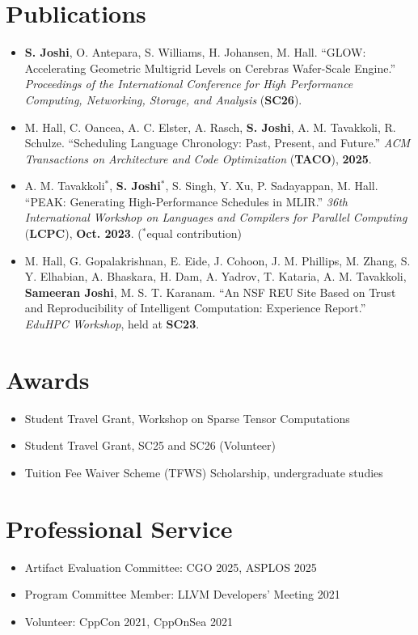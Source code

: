 \documentclass[10pt]{article}
\newcommand{\me}[1]{\textbf{#1}}
\begin{document}
\section*{Publications}

\begin{itemize}
  \item \me{S. Joshi}, O. Antepara, S. Williams, H. Johansen, M. Hall. ``GLOW: Accelerating Geometric Multigrid Levels on Cerebras Wafer-Scale Engine.'' \textit{Proceedings of the International Conference for High Performance Computing, Networking, Storage, and Analysis} (\textbf{SC26}).
  \item M. Hall, C. Oancea, A. C. Elster, A. Rasch, \me{S. Joshi}, A. M. Tavakkoli, R. Schulze. ``Scheduling Language Chronology: Past, Present, and Future.'' \textit{ACM Transactions on Architecture and Code Optimization} (\textbf{TACO}), \textbf{2025}.
  \item A. M. Tavakkoli$^{*}$, \me{S. Joshi}$^{*}$, S. Singh, Y. Xu, P. Sadayappan, M. Hall. ``PEAK: Generating High-Performance Schedules in MLIR.'' \textit{36th International Workshop on Languages and Compilers for Parallel Computing} (\textbf{LCPC}), \textbf{Oct. 2023}. ($^{*}$equal contribution)
  \item M. Hall, G. Gopalakrishnan, E. Eide, J. Cohoon, J. M. Phillips, M. Zhang, S. Y. Elhabian, A. Bhaskara, H. Dam, A. Yadrov, T. Kataria, A. M. Tavakkoli, \me{Sameeran Joshi}, M. S. T. Karanam. ``An NSF REU Site Based on Trust and Reproducibility of Intelligent Computation: Experience Report.'' \textit{EduHPC Workshop}, held at \textbf{SC23}.
\end{itemize}

\section*{Awards}

\begin{itemize}
  \item Student Travel Grant, Workshop on Sparse Tensor Computations
  \item Student Travel Grant, SC25 and SC26 (Volunteer)
  \item Tuition Fee Waiver Scheme (TFWS) Scholarship, undergraduate studies
\end{itemize}

\section*{Professional Service}

\begin{itemize}
  \item Artifact Evaluation Committee: CGO 2025, ASPLOS 2025
  \item Program Committee Member: LLVM Developers' Meeting 2021
  \item Volunteer: CppCon 2021, CppOnSea 2021
\end{itemize}
\end{document}
